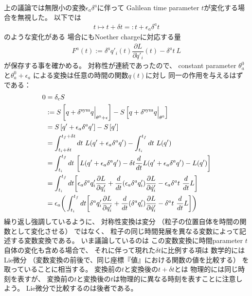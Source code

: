 上の議論では無限小の変換$\epsilon_a \delta^a$に伴って
Galilean time parameter $t$が変化する場合を無視した。
以下では
\begin{align}
  t
  \mapsto t + \delta t
  =: t + \epsilon_a \delta^a t
\end{align}
のような変化がある
場合にもNoether chargeに対応する量
\begin{align}
  F^a(t):=
    \delta^a q'_i (t)
  \dfrac{\partial L}{\partial \dot{q}'_i} (t)
-
  \delta^a t
  \ 
  L
\end{align}
が保存する事を確かめる。
対称性が連続であったので、
constant parameter $\theta_a^0$と$\theta_a^0 + \epsilon_a$
による変換は任意の時間の関数$q(t)$に対し
同一の作用を与えるはずである：
\begin{align}
  0 &=
  \delta_{\epsilon} S
\notag\\&:=
  S\left[ q + \delta^{\mathrm{sym}} q\Big|_{\theta^0 + \epsilon} \right]
  -
  S\left[ q + \delta^{\mathrm{sym}} q\Big|_{\theta^0} \right]
\notag\\&=
  S\left[ q' + \epsilon_a \delta^a q' \right]
  -
  S\left[ q' \right]
\notag\\&=
  \int_{t_i + \delta t}^{t_f + \delta t} dt\ 
    L( q' + \epsilon_a \delta^a q' )
  -
  \int_{t_i}^{t_f} dt\ 
    L( q' )
\notag\\&=
  \int_{t_i}^{t_f} dt\ 
  \bigg[
    L( q' + \epsilon_a \delta^a q' )
    - \delta t
    \dfrac{d}{dt}
    L( q' + \epsilon_a \delta^a q' )
  -
    L( q' )
  \bigg]
\notag\\&=
  \int_{t_i}^{t_f} dt
  \bigg[
    \epsilon_a
    \delta^a q'_i
    \dfrac{\partial L}{\partial q'_i}
  +
  \dfrac{d}{dt}
    (\epsilon_a
    \delta^a q'_i)
    \dfrac{\partial L}{\partial \dot{q}'_i}
  -
    \epsilon_a
    \delta^a t
    \ 
    \dfrac{d}{dt}
    L
  \bigg]
\notag\\&=
    \epsilon_a
  \bigg(
  \int_{t_i}^{t_f} dt
  \bigg[
    \delta^a q'_i
    \dfrac{\partial L}{\partial q'_i}
  +
    \dfrac{d}{dt}
    (\delta^a q'_i)
    \dfrac{\partial L}{\partial \dot{q}'_i}
  -
    \delta^a t
    \ 
    \dfrac{d}{dt}
    L
  \bigg]
  \bigg)
\label{action difference under symmetry transformation}
\end{align}
繰り返し強調しているように、
対称性変換は変分
（粒子の位置自体を時間の関数として変化させる）
ではなく、
粒子の同じ時間発展を異なる変数によって記述する変数変換である。
いま議論しているのは
この変数変換に時間parameter $t$自体の変化も含める場合で、
それに伴って現れた$\delta t$に比例する項は
数学的にはLie微分
（変数変換の前後で、同じ座標『値』における関数の値を比較する）
を取っていることに相当する。
変換前の$t$と変換後の$t + \delta t$とは
物理的には同じ時刻を表すが、
変換前の$t$と変換後の$t$は物理的に異なる時刻を表すことに注意しよう。
Lie微分で比較するのは後者である。

